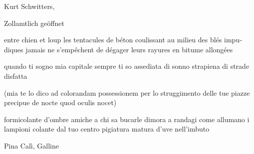 \begin{volumetitlepage}
\end{volumetitlepage}


\begin{artItem}
	Kurt Schwitters, \begin{otherlanguage}{german}%
		Zollamtlich geöffnet%
	\end{otherlanguage}
\end{artItem}

\begin{poem}
	\begin{otherlanguage}{french}
		\begin{stanza}
			entre chien et loup\verseline
			les tentacules de béton\verseline
			coulissant au milieu\verseline
			des blés impudiques\verseline
			jamais ne s'empêchent\verseline
			de dégager leurs rayures\verseline
			en bitume allongées
		\end{stanza}
	\end{otherlanguage}
\end{poem}

\clearpage


\begin{poem}
	\begin{stanza}
		quando ti sogno\verseline
		mia capitale\verseline
		sempre ti so assediata di sonno\verseline
		strapiena di strade\verseline
		disfatta
	\end{stanza}

	\begin{stanza}
		(mia te lo dico\verseline
		ad colorandam possessionem\verseline
		per lo struggimento delle tue piazze\verseline
		precipue de nocte\verseline
		quod oculis nocet)
	\end{stanza}

	\begin{stanza}
		formicolante d’ombre\verseline
		amiche a chi sa bucarle\verseline
		dimora a randagi come allumano i lampioni\verseline
		colante dal tuo centro\verseline
		pigiatura matura d’uve nell’imbuto
	\end{stanza}
\end{poem}

\clearpage


\begin{artItem}
	Pina Calì, Galline
\end{artItem}

